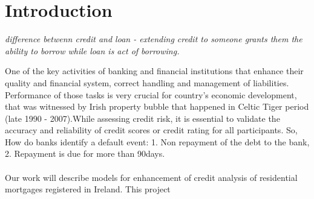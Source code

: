%
%
%
%

\chapter{Introduction}\label{C.intro}
\emph{difference betwenn credit and loan - extending credit to someone grants them the ability to borrow while loan is act of borrowing.}

One of the key activities of banking and financial institutions that enhance their quality and financial system, correct handling and management of liabilities. Performance of those tasks is very crucial for country's economic development, that was witnessed by Irish property bubble that happened in Celtic Tiger period (late 1990 - 2007).While assessing credit risk, it is essential to validate the accuracy and reliability of credit scores or credit rating for all participants. So, How do banks identify a default event: 1. Non repayment of the debt to the bank, 2. Repayment is due for more than 90days.\\\\



Our work will describe models for enhancement of credit analysis of residential mortgages registered in Ireland. This project 


